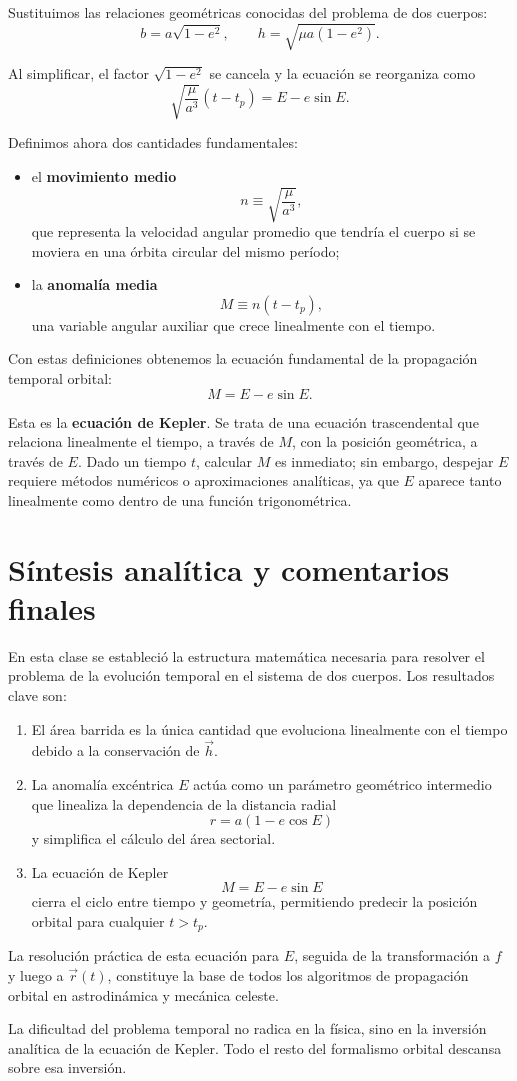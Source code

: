 Sustituimos las relaciones geométricas conocidas del problema de dos cuerpos:
\[
 b = a\sqrt{1-e^2},
\qquad
 h = \sqrt{\mu a(1-e^2)}.
\]

Al simplificar, el factor \(\sqrt{1-e^2}\) se cancela y la ecuación se reorganiza como
\[
 \sqrt{\frac{\mu}{a^3}}(t-t_p) = E - e\sin E.
\]

Definimos ahora dos cantidades fundamentales:
\begin{itemize}
    \item el \textbf{movimiento medio}
\[
 n \equiv \sqrt{\frac{\mu}{a^3}},
\]
    que representa la velocidad angular promedio que tendría el cuerpo si se moviera en una órbita circular del mismo período;
    \item la \textbf{anomalía media}
\[
 M \equiv n(t-t_p),
\]
    una variable angular auxiliar que crece linealmente con el tiempo.
\end{itemize}

Con estas definiciones obtenemos la ecuación fundamental de la propagación temporal orbital:
\[
 M = E - e\sin E.
\]

Esta es la \textbf{ecuación de Kepler}. Se trata de una ecuación trascendental que relaciona linealmente el tiempo, a través de \(M\), con la posición geométrica, a través de \(E\). Dado un tiempo \(t\), calcular \(M\) es inmediato; sin embargo, despejar \(E\) requiere métodos numéricos o aproximaciones analíticas, ya que \(E\) aparece tanto linealmente como dentro de una función trigonométrica.

\section{Síntesis analítica y comentarios finales}
En esta clase se estableció la estructura matemática necesaria para resolver el problema de la evolución temporal en el sistema de dos cuerpos. Los resultados clave son:
\begin{enumerate}
    \item El área barrida es la única cantidad que evoluciona linealmente con el tiempo debido a la conservación de \(\vec{h}\).
    \item La anomalía excéntrica \(E\) actúa como un parámetro geométrico intermedio que linealiza la dependencia de la distancia radial
\[
 r = a(1-e\cos E)
\]
y simplifica el cálculo del área sectorial.
    \item La ecuación de Kepler
\[
 M = E - e\sin E
\]
cierra el ciclo entre tiempo y geometría, permitiendo predecir la posición orbital para cualquier \(t>t_p\).
\end{enumerate}

La resolución práctica de esta ecuación para \(E\), seguida de la transformación a \(f\) y luego a \(\vec{r}(t)\), constituye la base de todos los algoritmos de propagación orbital en astrodinámica y mecánica celeste.

\begin{importante}
La dificultad del problema temporal no radica en la física, sino en la inversión analítica de la ecuación de Kepler. Todo el resto del formalismo orbital descansa sobre esa inversión.
\end{importante}